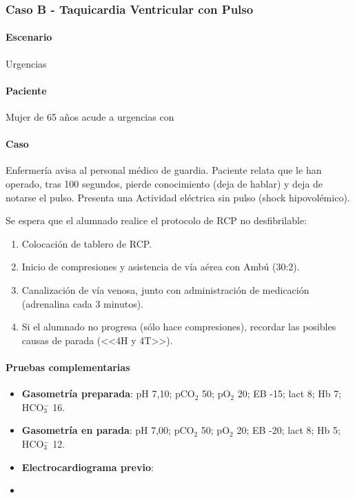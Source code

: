 \subsubsection{Caso B - Taquicardia Ventricular con Pulso}
\paragraph{Escenario} Urgencias
\paragraph{Paciente} Mujer de 65 años acude a urgencias con 
\paragraph{Caso} Enfermería avisa al personal médico de guardia. Paciente relata que le han operado, tras 100 segundos, pierde conocimiento (deja de hablar) y deja de notarse el pulso. Presenta una Actividad eléctrica sin pulso (shock hipovolémico).

Se espera que el alumnado realice el protocolo de RCP no desfibrilable:
\begin{enumerate}[topsep=0pt, partopsep=0pt,itemsep=0pt,parsep=0pt]
    \item Colocación de tablero de RCP.
    \item Inicio de compresiones y asistencia de vía aérea con Ambú (30:2).
    \item Canalización de vía venosa, junto con administración de medicación (adrenalina cada 3 minutos).
    \item Si el alumnado no progresa (sólo hace compresiones), recordar las posibles causas de parada (<<4H y 4T>>).
\end{enumerate}

\paragraph{Pruebas complementarias}
\begin{itemize}[topsep=0pt, partopsep=0pt,itemsep=0pt,parsep=0pt]
    \item \textbf{Gasometría preparada}: pH 7,10; pCO$_2$ 50; pO$_2$ 20; EB -15; lact 8; Hb 7; HCO$_3^-$ 16.
    \item \textbf{Gasometría en parada}: pH 7,00; pCO$_2$ 50; pO$_2$ 20; EB -20; lact 8; Hb 5; HCO$_3^-$ 12.
    \item \textbf{Electrocardiograma previo}: %
    \item \textbf{}
\end{itemize}

